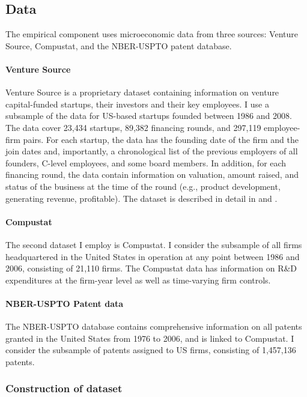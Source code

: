 \documentclass[12pt,english]{article}
\theoremstyle{remark}
\begin{document}
\subsection{Data}

The empirical component uses microeconomic data from three sources: Venture Source, Compustat, and the NBER-USPTO patent database.

\paragraph{Venture Source}

Venture Source is a proprietary dataset containing information on venture capital-funded startups, their investors and their key employees. I use a subsample of the data for US-based startups founded between 1986 and 2008. The data cover 23,434 startups, 89,382 financing rounds, and 297,119 employee-firm pairs. For each startup, the data has the founding date of the firm and the join dates and, importantly, a chronological list of the previous employers of all founders, C-level employees, and some board members. In addition, for each financing round, the data contain information on valuation, amount raised, and status of the business at the time of the round (e.g., product development, generating revenue, profitable). The dataset is described in detail in \cite{kaplan_how_2002} and \cite{kaplan_venture_2016}. 

\paragraph{Compustat}

The second dataset I employ is Compustat. I consider the subsample of all firms headquartered in the United States in operation at any point between 1986 and 2006, consisting of 21,110 firms. The Compustat data has information on R\&D expenditures at the firm-year level as well as time-varying firm controls.

\paragraph{NBER-USPTO Patent data}

The NBER-USPTO database contains comprehensive information on all patents granted in the United States from 1976 to 2006, and is linked to Compustat. I consider the subsample of patents assigned to US firms, consisting of 1,457,136 patents. 

\subsubsection{Construction of dataset}
\end{document}
